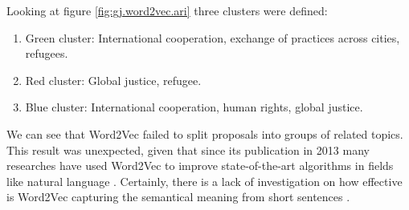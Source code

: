 Looking at figure \ref{fig:gj.word2vec.ari} three clusters were defined:
\begin{enumerate}[itemsep=1pt,parsep=1pt]
\item Green cluster: International cooperation, exchange of practices across cities, refugees.
\item Red cluster: Global justice, refugee.
\item Blue cluster: International cooperation, human rights, global justice.
\end{enumerate}
We can see that Word2Vec failed to split proposals into groups of related topics. This result was unexpected, given that since its publication in 2013 many researches have used Word2Vec to improve state-of-the-art algorithms in fields like natural language \cite{semantic.short}. Certainly, there is a lack of investigation on how effective is Word2Vec capturing the semantical meaning from short sentences \cite{semantic.short}.
